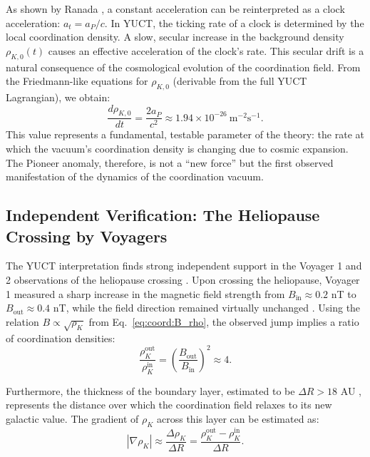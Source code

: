 \documentclass[12pt,a4paper]{article}
\theoremstyle{remark}
\begin{document}
	As shown by Ranada \cite{Ranada2005}, a constant acceleration can be reinterpreted as a clock acceleration: \(a_t = a_P / c\). In YUCT, the ticking rate of a clock is determined by the local coordination density. A slow, secular increase in the background density \(\rho_{K,0}(t)\) causes an effective acceleration of the clock's rate. This secular drift is a natural consequence of the cosmological evolution of the coordination field. From the Friedmann-like equations for \(\rho_{K,0}\) (derivable from the full YUCT Lagrangian), we obtain:
	\begin{equation}
		\frac{d\rho_{K,0}}{dt} = \frac{2a_P}{c^2} \approx 1.94 \times 10^{-26}\ \text{m}^{-2}\text{s}^{-1}.
		\label{eq:coord:rho_dot}
	\end{equation}
	This value represents a fundamental, testable parameter of the theory: the rate at which the vacuum's coordination density is changing due to cosmic expansion. The Pioneer anomaly, therefore, is not a ``new force'' but the first observed manifestation of the dynamics of the coordination vacuum.
	
	\subsection{Independent Verification: The Heliopause Crossing by Voyagers}
	\label{subsec:coord:voyager}
	
	The YUCT interpretation finds strong independent support in the Voyager 1 and 2 observations of the heliopause crossing \cite{Burlaga2013}. Upon crossing the heliopause, Voyager 1 measured a sharp increase in the magnetic field strength from \(B_{\text{in}} \approx 0.2\) nT to \(B_{\text{out}} \approx 0.4\) nT, while the field direction remained virtually unchanged \cite{Burlaga2013}. Using the relation \(B \propto \sqrt{\rho_K}\) from Eq.~\eqref{eq:coord:B_rho}, the observed jump implies a ratio of coordination densities:
	\begin{equation}
		\frac{\rho_K^{\text{out}}}{\rho_K^{\text{in}}} = \left( \frac{B_{\text{out}}}{B_{\text{in}}} \right)^2 \approx 4.
		\label{eq:coord:rho_ratio_voyager}
	\end{equation}
	
	Furthermore, the thickness of the boundary layer, estimated to be \(\Delta R > 18\) AU \cite{Richardson2024}, represents the distance over which the coordination field relaxes to its new galactic value. The gradient of \(\rho_K\) across this layer can be estimated as:
	\begin{equation}
		|\nabla \rho_K| \approx \frac{\Delta \rho_K}{\Delta R} = \frac{\rho_K^{\text{out}} - \rho_K^{\text{in}}}{\Delta R}.
		\label{eq:coord:gradient_estimate}
	\end{equation}
	
\end{document}
